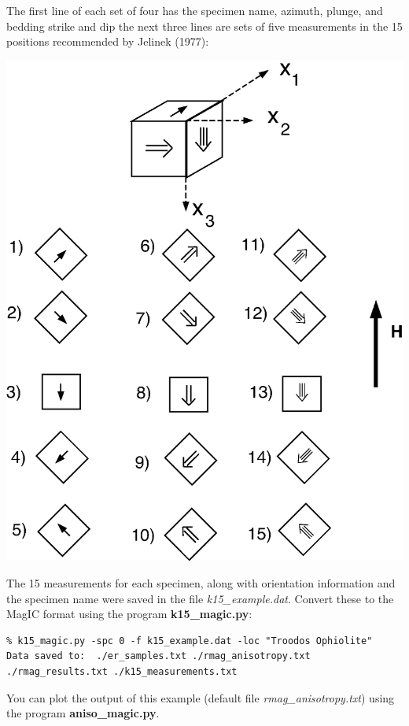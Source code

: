 \documentclass[11pt]{book}
\begin{document}
{{{  The first line of each set of four has the specimen name, azimuth, plunge, and bedding strike and dip
  the next three lines are sets of five measurements in the 15 positions 
 recommended by Jelinek (1977):  \nocite{jelinek77}

  \includegraphics[width=15cm]{EPSfiles/meas15.eps}
  
  
  The 15 measurements for each specimen, along with orientation information and the specimen name were saved in the file {\it k15\_example.dat}.    Convert these to the MagIC format using the program {\bf k15\_magic.py}:

\begin{verbatim}
% k15_magic.py -spc 0 -f k15_example.dat -loc "Troodos Ophiolite"
Data saved to:  ./er_samples.txt ./rmag_anisotropy.txt ./rmag_results.txt ./k15_measurements.txt
 \end{verbatim}

You can plot the output of this example (default file {\it rmag\_anisotropy.txt}) using the program {\bf aniso\_magic.py}.     

}}}
\end{document}
